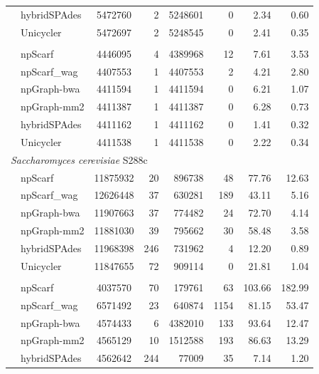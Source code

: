 \begin{longtable}[!hpt]{llcrrrrr}
& hybridSPAdes & 5472760  &  2  &  5248601  &  0  &  2.34 & 0.60\\*
& Unicycler & 5472697  & 2  & 5248545  &  0 & 2.41  &  0.35\\
\hline
\rowcolor{Gray}
\multicolumn{8}{l}{\emph{Mycobacterium tuberculosis} H37Rv} \\* %
\nobreakmidrule
\rowcolor{Gray}
& npScarf &  4446095 &  4  & 4389968   &  12  & 7.61  & 3.53\\*
\rowcolor{Gray}
& npScarf\_wag &  4407553 &  1  &  4407553  &  2  & 4.21  & 2.80\\*
\rowcolor{Gray}
& npGraph-bwa & 4411594  &  1  &  4411594  &  0  & 6.21  & 1.07\\*
\rowcolor{Gray}
& npGraph-mm2 & 4411387  & 1   &  4411387  &  0  & 6.28  & 0.73\\*
\rowcolor{Gray}
& hybridSPAdes & 4411162  &  1  &  4411162  &  0  &  1.41 &  0.32\\*
\rowcolor{Gray}
& Unicycler & 4411538  &  1  &  4411538  &  0  &  2.22 &  0.34\\
\hline
\multicolumn{8}{l}{\emph{Saccharomyces cerevisiae} S288c} \\* %
\nobreakmidrule
& npScarf &  11875932 &  20  &  896738  &  48  &  77.76 & 12.63 \\*
& npScarf\_wag & 12626448  &  37  &  630281  &  189  & 43.11  & 5.16 \\*
& npGraph-bwa & 11907663  &  37  &  774482  &  24 &  72.70 &  4.14\\*
& npGraph-mm2 & 11881030  &  39  &  795662  &  30 &  58.48 &  3.58\\*
& hybridSPAdes &  11968398 &  246  &  731962  &  4  & 12.20  & 0.89\\*
& Unicycler &  11847655 & 72  & 909114  &  0 & 21.81  &  1.04\\
\hline
\rowcolor{Gray}
\multicolumn{8}{l}{\emph{Shigella dysenteriae}  Sd197} \\* %
\nobreakmidrule
\rowcolor{Gray}
& npScarf &  4037570 &  70  & 179761   &  63  & 103.66  & 182.99\\*
\rowcolor{Gray}
& npScarf\_wag & 6571492  &  23  &  640874  &  1154  &  81.15 & 53.47\\*
\rowcolor{Gray}
& npGraph-bwa & 4574433  &  6  &  4382010  &  133  & 93.64  & 12.47\\*
\rowcolor{Gray}
& npGraph-mm2 & 4565129  &  10  &  1512588  &  193  & 86.63  & 13.29\\*
\rowcolor{Gray}
& hybridSPAdes &  4562642 & 244   &  77009  & 35   & 7.14  &  1.20\\*

\end{longtable}
